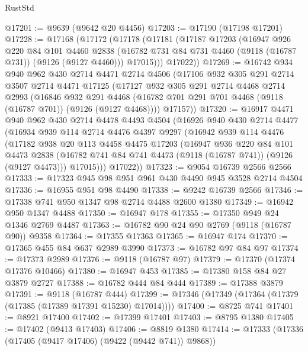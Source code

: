 \begin{lexlean}{RustStd}
\begin{coremodule}
@17201 := @9639 (@9642 @20 @4456)
@17203 := @17190 (@17198 @17201)
@17228 := @17168
    (@17172
      (@17178
        (@17181
          (@17187
            @17203
            (@16947
              @926
              @220
              @84
              @101
              @4460
              @2838
              (@16782 @731 @84 @731 @4460 (@9118 (@16787 @731)) (@9126 (@9127 @4460)))
              @17015)))
        @17022))
@17269 := @16742
    @934
    @940
    @962
    @430
    @2714
    @4471
    @2714
    @4506
    (@17106
      @932
      @305
      @291
      @2714
      @3507
      @2714
      @4471
      @17125
      (@17127
        @932
        @305
        @291
        @2714
        @4468
        @2714
        @2993
        (@16846
          @932
          @291
          @4468
          (@16782 @701 @291 @701 @4468 (@9118 (@16787 @701)) (@9126 (@9127 @4468))))
        @17157))
@17320 := @16917
    @4471
    @940
    @962
    @430
    @2714
    @4478
    @4493
    @4504
    (@16926
      @940
      @430
      @2714
      @4477
      (@16934
        @939
        @114
        @2714
        @4476
        @4397
        @9297
        (@16942
          @939
          @114
          @4476
          (@17182
            @938
            @20
            @113
            @4458
            @4475
            @17203
            (@16947
              @936
              @220
              @84
              @101
              @4473
              @2838
              (@16782 @741 @84 @741 @4473 (@9118 (@16787 @741)) (@9126 (@9127 @4473)))
              @17015)))
        @17022))
@17323 := @9054 @16739 @2566 @2566
@17333 := @17323 @945 @98 @951 @961 @430 @4490 @945 @3528 @2714 @4504
@17336 := @16955 @951 @98 @4490
@17338 := @9242 @16739 @2566
@17346 := @17338 @741 @950 @1347 @98 @2714 @4488 @2600 @1380
@17349 := @16942 @950 @1347 @4488
@17350 := @16947 @178
@17355 := @17350 @949 @24 @1346 @2769 @4487
@17363 := @16782 @90 @24 @90 @2769 (@9118 (@16787 @90)) @9358
@17364 := @17355 @17363
@17365 := @16947 @174
@17370 := @17365 @455 @84 @637 @2989 @3990
@17373 := @16782 @97 @84 @97
@17374 := @17373 @2989
@17376 := @9118 (@16787 @97)
@17379 := @17370 (@17374 @17376 @10466)
@17380 := @16947 @453
@17385 := @17380 @158 @84 @27 @3879 @2727
@17388 := @16782 @444 @84 @444
@17389 := @17388 @3879
@17391 := @9118 (@16787 @444)
@17399 := @17346 (@17349 (@17364 (@17379 (@17385 (@17389 @17391 @15230) @17014))))
@17400 := @8725 @741
@17401 := @8921 @17400
@17402 := @17399 @17401
@17403 := @8795 @1380
@17405 := @17402 (@9413 @17403)
@17406 := @8819 @1380
@17414 := @17333 (@17336 (@17405 (@9417 @17406) (@9422 (@9442 @741)) @9868))

\end{coremodule}
\end{lexlean}
